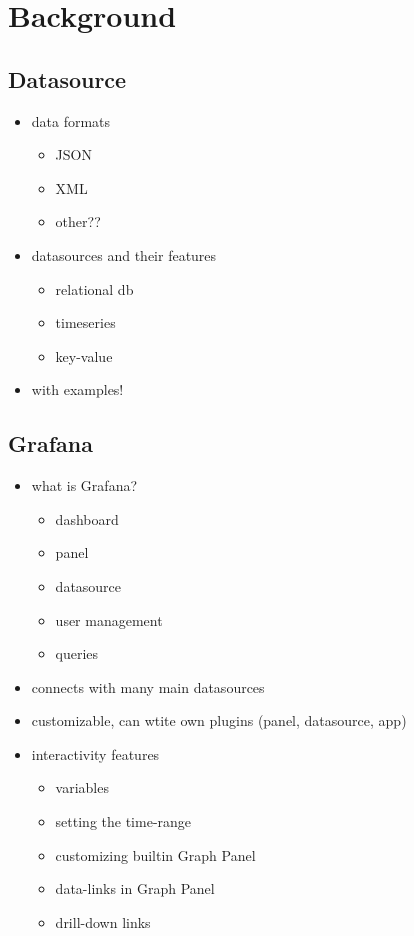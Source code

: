 \chapter{Background}

\section{Datasource}

\begin{itemize}
	\item data formats
	\begin{itemize}
		\item JSON
		\item XML
		\item other??
	\end{itemize}
	\item datasources and their features
	\begin{itemize}
		\item relational db
		\item timeseries
		\item key-value
	\end{itemize}
	\item with examples!
\end{itemize}


\section{Grafana}

\begin{itemize}
	\item what is Grafana?
	\begin{itemize}
		\item dashboard
		\item panel
		\item datasource
		\item user management
		\item queries
	\end{itemize}
	\item connects with many main datasources
	\item customizable, can wtite own plugins (panel, datasource, app)
	\item interactivity features
	\begin{itemize}
		\item variables
		\item setting the time-range
		\item customizing builtin Graph Panel
		\item data-links in Graph Panel
		\item drill-down links
	\end{itemize}
\end{itemize}

